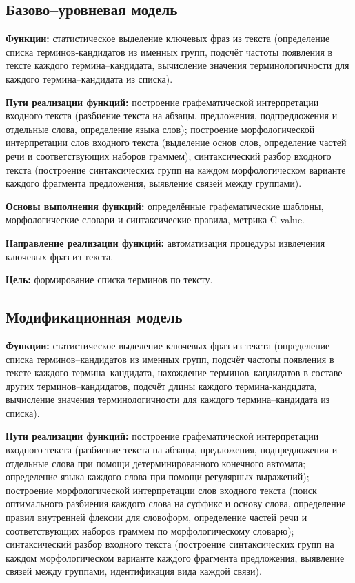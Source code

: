 \subsection{Базово--уровневая модель}
\textbf{Функции:} статистическое выделение ключевых фраз
из текста (определение списка терминов-кандидатов из именных
групп, подсчёт частоты появления в тексте каждого
термина--кандидата, вычисление значения терминологичности для
каждого термина--кандидата из списка).

\textbf{Пути реализации функций:}
построение графематической интерпретации входного текста
(разбиение текста на абзацы, предложения, подпредложения и отдельные
слова, определение языка слов); построение морфологической
интерпретации слов входного текста (выделение основ слов,
определение частей речи и соответствующих наборов граммем);
синтаксический разбор входного текста (построение синтаксических
групп на каждом морфологическом варианте каждого фрагмента
предложения, выявление связей между группами).

\textbf{Основы выполнения функций:} определённые
графематические шаблоны, морфологические словари и
синтаксические правила, метрика C-value.

\textbf{Направление реализации функций:} автоматизация
процедуры извлечения ключевых фраз из текста.

\textbf{Цель:} формирование списка терминов по тексту.

\subsection{Модификационная модель}
\textbf{Функции:} статистическое выделение ключевых фраз из текста
(определение списка терминов--кандидатов из именных групп, подсчёт
частоты появления в тексте каждого термина--кандидата,
нахождение терминов--кандидатов в составе других
терминов--кандидатов, подсчёт длины каждого термина-кандидата,
вычисление значения терминологичности для каждого термина--кандидата
из списка).

\textbf{Пути реализации функций:} построение графематической
интерпретации входного текста (разбиение текста на абзацы,
предложения, подпредложения и отдельные слова при помощи
детерминированного конечного автомата; определение языка каждого
слова при помощи регулярных выражений); построение морфологической
интерпретации слов входного текста (поиск оптимального разбиения
каждого слова на суффикс и основу слова, определение правил
внутренней флексии для словоформ, определение частей речи и
соответствующих наборов граммем по морфологическому словарю);
синтаксический разбор входного текста (построение синтаксических
групп на каждом морфологическом варианте каждого фрагмента предложения,
выявление связей между группами, идентификация вида каждой связи).

